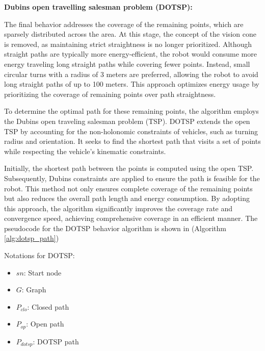 \textbf{Dubins open travelling salesman problem (DOTSP):}


\vspace*{6mm}   

The final behavior addresses the coverage of the remaining points, which are sparsely distributed across the area. At this stage, the concept of the vision cone is removed, as maintaining strict straightness is no longer prioritized. Although straight paths are typically more energy-efficient, the robot would consume more energy traveling long straight paths while covering fewer points. Instead, small circular turns with a radius of 3 meters are preferred, allowing the robot to avoid long straight paths of up to 100 meters. This approach optimizes energy usage by prioritizing the coverage of remaining points over path straightness.

\vspace*{6mm}   

To determine the optimal path for these remaining points, the algorithm employs the Dubins open traveling salesman problem (TSP). DOTSP extends the open TSP by accounting for the non-holonomic constraints of vehicles, such as turning radius and orientation. It seeks to find the shortest path that visits a set of points while respecting the vehicle's kinematic constraints. 

\vspace*{6mm}   

Initially, the shortest path between the points is computed using the open TSP. Subsequently, Dubins constraints are applied to ensure the path is feasible for the robot. This method not only ensures complete coverage of the remaining points but also reduces the overall path length and energy consumption. By adopting this approach, the algorithm significantly improves the coverage rate and convergence speed, achieving comprehensive coverage in an efficient manner. The pseudocode for the DOTSP behavior algorithm is shown in (Algorithm \autoref{alg:dotsp_path})

\vspace*{6mm}   

Notations for DOTSP:
\begin{multicols}{2}
\begin{itemize}[noitemsep,topsep=0pt]
    \item $sn$: Start node
    \item $G$: Graph
    \item $P_{clo}$: Closed path
    \item $P_{op}$: Open path
    \item $P_{dotsp}$: DOTSP path
\end{itemize}
\end{multicols}

